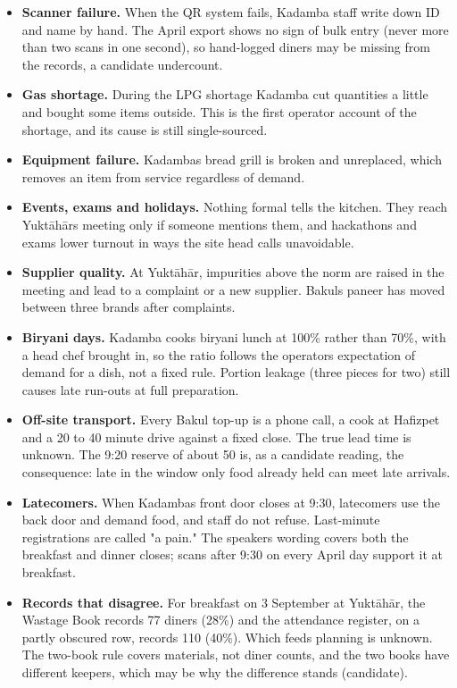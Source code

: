 \documentclass[
  10pt,
  table]{article}
\providecommand{\tightlist}{%
  \setlength{\itemsep}{0pt}\setlength{\parskip}{0pt}}
\renewcommand{\tightlist}{\setlength{\itemsep}{1.5pt}\setlength{\parskip}{0pt}}
\begin{document}
\begin{itemize}
\tightlist
\item
  \textbf{Scanner failure.} When the QR system fails, Kadamba staff write down ID and name by hand. The April export shows no sign of bulk entry (never more than two scans in one second), so hand-logged diners may be missing from the records, a candidate undercount.
\item
  \textbf{Gas shortage.} During the LPG shortage Kadamba cut quantities a little and bought some items outside. This is the first operator account of the shortage, and its cause is still single-sourced.
\item
  \textbf{Equipment failure.} Kadamba\textquotesingle s bread grill is broken and unreplaced, which removes an item from service regardless of demand.
\item
  \textbf{Events, exams and holidays.} Nothing formal tells the kitchen. They reach Yuktāhār\textquotesingle s meeting only if someone mentions them, and hackathons and exams lower turnout in ways the site head calls unavoidable.
\item
  \textbf{Supplier quality.} At Yuktāhār, impurities above the norm are raised in the meeting and lead to a complaint or a new supplier. Bakul\textquotesingle s paneer has moved between three brands after complaints.
\item
  \textbf{Biryani days.} Kadamba cooks biryani lunch at 100\% rather than 70\%, with a head chef brought in, so the ratio follows the operator\textquotesingle s expectation of demand for a dish, not a fixed rule. Portion leakage (three pieces for two) still causes late run-outs at full preparation.
\item
  \textbf{Off-site transport.} Every Bakul top-up is a phone call, a cook at Hafizpet and a 20 to 40 minute drive against a fixed close. The true lead time is unknown. The 9:20 reserve of about 50 is, as a candidate reading, the consequence: late in the window only food already held can meet late arrivals.
\item
  \textbf{Latecomers.} When Kadamba\textquotesingle s front door closes at 9:30, latecomers use the back door and demand food, and staff do not refuse. Last-minute registrations are called "a pain." The speaker\textquotesingle s wording covers both the breakfast and dinner closes; scans after 9:30 on every April day support it at breakfast.
\item
  \textbf{Records that disagree.} For breakfast on 3 September at Yuktāhār, the Wastage Book records 77 diners (28\%) and the attendance register, on a partly obscured row, records 110 (40\%). Which feeds planning is unknown. The two-book rule covers materials, not diner counts, and the two books have different keepers, which may be why the difference stands (candidate).
\end{itemize}
\end{document}
